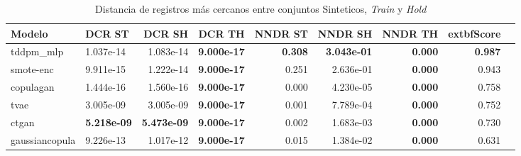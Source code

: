 \begin{table}[H]
\centering
\caption{Distancia de registros más cercanos entre conjuntos Sinteticos, \emph{Train} y \emph{Hold}}
\label{table-dcr-economicos-b-3}
\begin{tabular}{|l|l|r|r|r|r|r|r|r|}
\hline
\rowcolor[gray]{0.8}
Modelo & DCR ST & DCR SH & DCR TH & NNDR ST & NNDR SH & NNDR TH & 	extbf{Score} \\
\hline tddpm\_mlp & 1.037e-14 & 1.083e-14 & \cellcolor[rgb]{0.9, 0.54, 0.52} \bfseries 9.000e-17 & \bfseries 0.308 & \bfseries 3.043e-01 & \cellcolor[rgb]{0.9, 0.54, 0.52} \bfseries 0.000 & \bfseries 0.987 \\
\hline smote-enc & 9.911e-15 & 1.222e-14 & \cellcolor[rgb]{0.9, 0.54, 0.52} \bfseries 9.000e-17 & 0.251 & 2.636e-01 & \cellcolor[rgb]{0.9, 0.54, 0.52} \bfseries 0.000 & 0.943 \\
\hline copulagan & \cellcolor[rgb]{0.9, 0.54, 0.52} 1.444e-16 & \cellcolor[rgb]{0.9, 0.54, 0.52} 1.560e-16 & \cellcolor[rgb]{0.9, 0.54, 0.52} \bfseries 9.000e-17 & \cellcolor[rgb]{0.9, 0.54, 0.52} 0.000 & \cellcolor[rgb]{0.9, 0.54, 0.52} 4.230e-05 & \cellcolor[rgb]{0.9, 0.54, 0.52} \bfseries 0.000 & 0.758 \\
\hline tvae & 3.005e-09 & 3.005e-09 & \cellcolor[rgb]{0.9, 0.54, 0.52} \bfseries 9.000e-17 & 0.001 & 7.789e-04 & \cellcolor[rgb]{0.9, 0.54, 0.52} \bfseries 0.000 & 0.752 \\
\hline ctgan & \bfseries 5.218e-09 & \bfseries 5.473e-09 & \cellcolor[rgb]{0.9, 0.54, 0.52} \bfseries 9.000e-17 & 0.002 & 1.683e-03 & \cellcolor[rgb]{0.9, 0.54, 0.52} \bfseries 0.000 & 0.730 \\
\hline gaussiancopula & 9.226e-13 & 1.017e-12 & \cellcolor[rgb]{0.9, 0.54, 0.52} \bfseries 9.000e-17 & 0.015 & 1.384e-02 & \cellcolor[rgb]{0.9, 0.54, 0.52} \bfseries 0.000 & 0.631 \\
\hline
\end{tabular}
\end{table}
